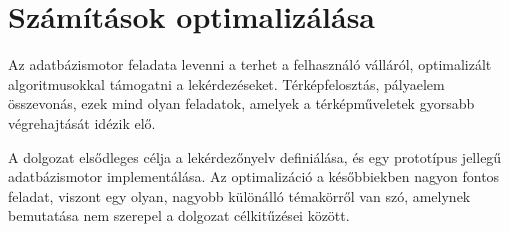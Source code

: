 \section{Számítások optimalizálása}

Az adatbázismotor feladata levenni a terhet a felhasználó válláról,  optimalizált algoritmusokkal támogatni a lekérdezéseket. Térképfelosztás, pályaelem összevonás, ezek mind olyan feladatok, amelyek a térképműveletek gyorsabb végrehajtását idézik elő.

A dolgozat elsődleges célja a lekérdezőnyelv definiálása, és egy prototípus jellegű adatbázismotor implementálása. Az optimalizáció a későbbiekben nagyon fontos feladat, viszont egy olyan, nagyobb különálló témakörről van szó, amelynek bemutatása nem szerepel a dolgozat célkitűzései között.
